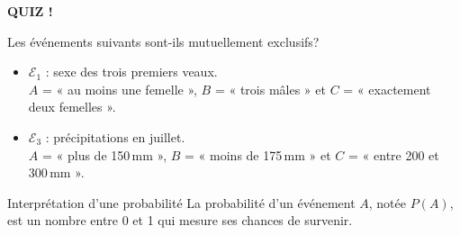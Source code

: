 \documentclass{BeamerTemplate}
\begin{document}
\begin{frame}[plain,t]
  \centerline{\LARGE\bfseries\alert{QUIZ !}}

  \medskip
  Les événements suivants sont-ils mutuellement exclusifs?
  \begin{itemize}\itemsep 1.4cm
    \item $\mathcal{E}_1$ : sexe des trois premiers veaux.\\
      $A$ = « au moins une femelle », $B$ = « trois mâles » et
      $C$ = « exactement deux femelles ».
    \item<2-> $\mathcal{E}_3$ : précipitations en juillet.\\
      $A$ = « plus de 150\,mm », $B$ = « moins de 175\,mm » et
      $C$ = « entre 200 et 300\,mm ».
  \end{itemize}
\end{frame}

\begin{frame}[t]{Interprétation d'une probabilité}
  La probabilité d'un événement $A$, notée $P(A)$, est un nombre entre 0 et 1
  qui mesure ses chances de survenir.

  \medskip
\end{frame}
\end{document}

